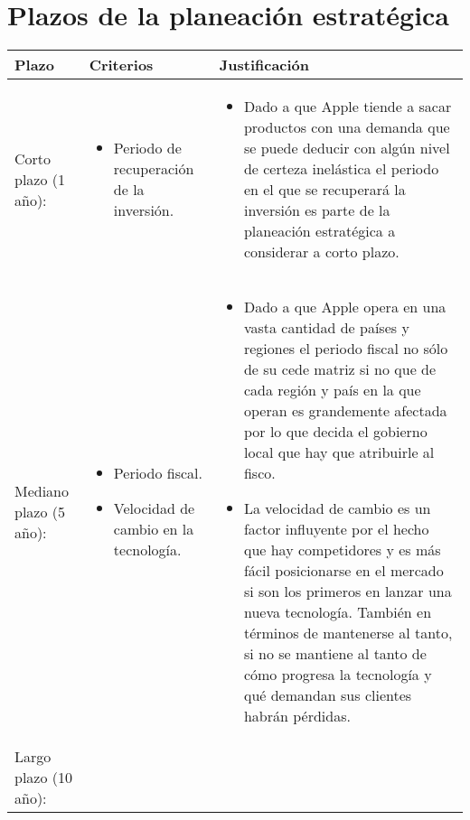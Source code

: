 \documentclass{article}
\begin{document}
\section{Plazos de la planeación estratégica}
\begin{center}
    \begin{tabular}{ |p{4cm}|p{4cm}|p{8cm}| }
        \hline
            Plazo & Criterios & Justificación \\
        \hline 
            Corto plazo (1 año): 
            & 
            \begin{itemize}
                \item Periodo de recuperación de la inversión.
            \end{itemize}
            & 
            \begin{itemize}
                \item Dado a que Apple tiende a sacar productos con una demanda que se puede deducir con algún nivel de certeza inelástica el periodo en el que se recuperará la inversión es parte de la planeación estratégica a considerar a corto plazo.
            \end{itemize}
            \\ 
        \hline
            Mediano plazo (5 año): 
            & 
            \begin{itemize}
                \item Periodo fiscal.
                \item Velocidad de cambio en la tecnología.
            \end{itemize}
            & 
            \begin{itemize}
                \item Dado a que Apple opera en una vasta cantidad de países y regiones el periodo fiscal no sólo de su cede matriz si no que de cada región y país en la que operan es grandemente afectada por lo que decida el gobierno local que hay que atribuirle al fisco.
                \item La velocidad de cambio es un factor influyente por el hecho que hay competidores y es más fácil posicionarse en el mercado si son los primeros en lanzar una nueva tecnología. También en términos de mantenerse al tanto, si no se mantiene al tanto de cómo progresa la tecnología y qué demandan sus clientes habrán pérdidas.
            \end{itemize}
            \\ 
        \hline
            Largo plazo (10 año): 
            & 
            \begin{itemize}

\end{itemize}
\end{tabular}
\end{center}
\end{document}
